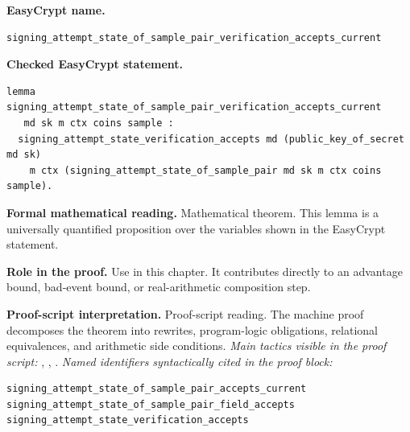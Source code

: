 \begin{formaltheorem}
\noindent\textbf{EasyCrypt name.}
\begin{lstlisting}[language=EasyCrypt,basicstyle=\ttfamily\scriptsize]
signing_attempt_state_of_sample_pair_verification_accepts_current
\end{lstlisting}
\noindent\textbf{Checked EasyCrypt statement.}
\begin{lstlisting}[language=EasyCrypt,basicstyle=\ttfamily\scriptsize]
lemma signing_attempt_state_of_sample_pair_verification_accepts_current
   md sk m ctx coins sample :
  signing_attempt_state_verification_accepts md (public_key_of_secret md sk)
    m ctx (signing_attempt_state_of_sample_pair md sk m ctx coins sample).
\end{lstlisting}
\noindent\textbf{Formal mathematical reading.}
Mathematical theorem. This lemma is a universally quantified proposition over the variables shown in the EasyCrypt statement.

\noindent\textbf{Role in the proof.}
Use in this chapter. It contributes directly to an advantage bound, bad-event bound, or real-arithmetic composition step.

\noindent\textbf{Proof-script interpretation.}
Proof-script reading. The machine proof decomposes the theorem into rewrites, program-logic obligations, relational equivalences, and arithmetic side conditions.
\emph{Main tactics visible in the proof script:} , , .
\emph{Named identifiers syntactically cited in the proof block:}
\begin{lstlisting}[language=EasyCrypt,basicstyle=\ttfamily\scriptsize]
signing_attempt_state_of_sample_pair_accepts_current
signing_attempt_state_of_sample_pair_field_accepts
signing_attempt_state_verification_accepts
\end{lstlisting}

\end{formaltheorem}

